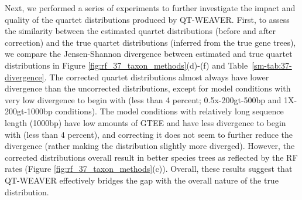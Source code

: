 \documentclass[10pt,a4paper]{article}
\newcommand{\addb}[1]{{\color{red} #1}}
\begin{document}
Next, we performed a series of experiments to further investigate the impact and quality of the quartet distributions produced by QT-WEAVER. First, to assess the similarity between the estimated quartet distributions (before and after correction) and the true quartet distributions (inferred from the true gene trees), we compare the Jensen-Shannon divergence between estimated and true quartet distributions in Figure \ref{fig:rf_37_taxon_methods}(d)-(f) and Table~\ref{sm-tab:37-divergence}. The corrected quartet distributions almost always have lower divergence than the uncorrected distributions, except for model conditions with very low divergence to begin with (less than 4 percent; 0.5x-200gt-500bp and 1X-200gt-1000bp conditions). The model conditions with relatively long sequence length (1000bp) have low amounts of GTEE and have less divergence to begin with (less than 4 percent), and correcting it does not seem to further reduce the divergence (rather making the distribution slightly more diverged). However, the corrected distributions overall result in better species trees as reflected by the RF rates (Figure \ref{fig:rf_37_taxon_methods}(c)). %
Overall, these results suggest that QT-WEAVER effectively bridges the gap with the overall nature of the true distribution. %



\end{document}

